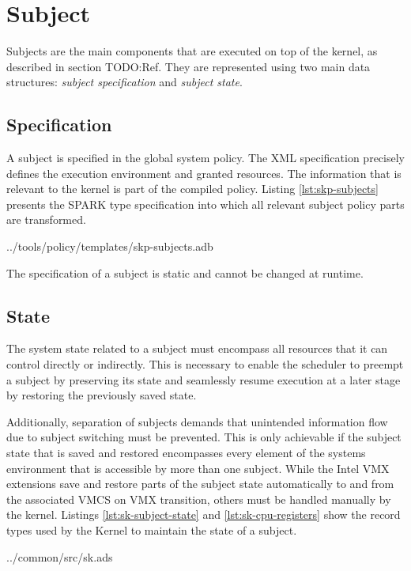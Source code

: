 \section{Subject}\label{sec:subject}
Subjects are the main components that are executed on top of the kernel, as
described in section TODO:Ref. They are represented using two main data
structures: \emph{subject specification} and \emph{subject state}.

\subsection{Specification}
A subject is specified in the global system policy. The XML specification
precisely defines the execution environment and granted resources. The
information that is relevant to the kernel is part of the compiled policy.
Listing \ref{lst:skp-subjects} presents the SPARK type specification into which
all relevant subject policy parts are transformed.


	{../tools/policy/templates/skp-subjects.adb}

The specification of a subject is static and cannot be changed at runtime.

\subsection{State}
The system state related to a subject must encompass all resources that it can
control directly or indirectly. This is necessary to enable the scheduler to
preempt a subject by preserving its state and seamlessly resume execution at a
later stage by restoring the previously saved state.

Additionally, separation of subjects demands that unintended information flow
due to subject switching must be prevented. This is only achievable if the
subject state that is saved and restored encompasses every element of the
systems environment that is accessible by more than one subject. While the Intel
VMX extensions save and restore parts of the subject state automatically to and
from the associated VMCS on VMX transition, others must be handled manually by
the kernel. Listings \ref{lst:sk-subject-state} and \ref{lst:sk-cpu-registers}
show the record types used by the Kernel to maintain the state of a subject.


	{../common/src/sk.ads}

